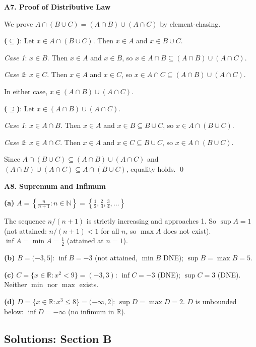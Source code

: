 \documentclass[12pt, a4paper]{article}
\theoremstyle{definition}
\newcommand{\R}{\mathbb{R}}
\newcommand{\N}{\mathbb{N}}
\begin{document}
\begin{solbox}
\textbf{A7. Proof of Distributive Law}

We prove $A\cap(B\cup C) = (A\cap B)\cup(A\cap C)$ by element-chasing.

\textbf{($\subseteq$)}: Let $x \in A\cap(B\cup C)$. Then $x\in A$ and $x\in B\cup C$.

\textit{Case 1}: $x\in B$. Then $x\in A$ and $x\in B$, so $x\in A\cap B\subseteq (A\cap B)\cup(A\cap C)$.

\textit{Case 2}: $x\in C$. Then $x\in A$ and $x\in C$, so $x\in A\cap C\subseteq (A\cap B)\cup(A\cap C)$.

In either case, $x\in(A\cap B)\cup(A\cap C)$.

\textbf{($\supseteq$)}: Let $x\in(A\cap B)\cup(A\cap C)$.

\textit{Case 1}: $x\in A\cap B$. Then $x\in A$ and $x\in B\subseteq B\cup C$, so $x\in A\cap(B\cup C)$.

\textit{Case 2}: $x\in A\cap C$. Then $x\in A$ and $x\in C\subseteq B\cup C$, so $x\in A\cap(B\cup C)$.

Since $A\cap(B\cup C)\subseteq(A\cap B)\cup(A\cap C)$ and $(A\cap B)\cup(A\cap C)\subseteq A\cap(B\cup C)$, equality holds. \qed
\end{solbox}

\begin{solbox}
\textbf{A8. Supremum and Infimum}

\textbf{(a)} $A=\left\{\frac{n}{n+1}:n\in\N\right\} = \left\{\frac{1}{2},\frac{2}{3},\frac{3}{4},\ldots\right\}$

The sequence $n/(n+1)$ is strictly increasing and approaches 1. So $\sup A = 1$ (not attained: $n/(n+1)<1$ for all $n$, so $\max A$ does not exist). $\inf A = \min A = \frac{1}{2}$ (attained at $n=1$).

\textbf{(b)} $B=(-3,5]$: $\inf B = -3$ (not attained, $\min B$ DNE); $\sup B = \max B = 5$.

\textbf{(c)} $C=\{x\in\R:x^2<9\} = (-3,3)$: $\inf C = -3$ (DNE); $\sup C = 3$ (DNE). Neither $\min$ nor $\max$ exists.

\textbf{(d)} $D=\{x\in\R:x^3\leq 8\} = (-\infty,2]$: $\sup D = \max D = 2$. $D$ is unbounded below: $\inf D = -\infty$ (no infimum in $\R$).
\end{solbox}

\subsection{Solutions: Section B}
\end{document}
